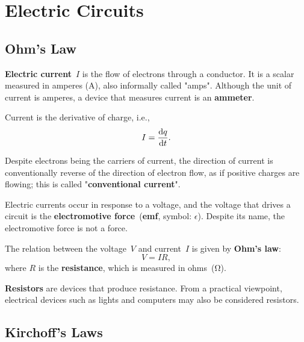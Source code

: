 \chapter{Electric Circuits}

\section{Ohm's Law}

\textbf{Electric current}~\(I\) is the flow of electrons through a conductor.
It is a scalar measured in amperes (\unit{\ampere}),
also informally called "amps".
Although the unit of current is amperes,
a device that measures current is an \textbf{ammeter}.

Current is the derivative of charge, i.e.,
\begin{equation} \label{eq:current-charge}
    I = \odv{q}{t}.
\end{equation}

Despite electrons being the carriers of current,
the direction of current is conventionally reverse
of the direction of electron flow,
as if positive charges are flowing;
this is called "\textbf{conventional current}".

Electric currents occur in response to a voltage,
and the voltage that drives a circuit is the \textbf{electromotive
force}~(\textbf{emf}, symbol: \(\epsilon\)).
Despite its name, the electromotive force is not a force.

The relation between the voltage~\(V\) and current~\(I\) is given by
\textbf{Ohm's law}:
\begin{equation} \label{eq:ohms-law}
    V = I R,
\end{equation}
where \(R\) is the \textbf{resistance}, which is measured in ohms~(\unit{\ohm}).

\textbf{Resistors} are devices that produce resistance.
From a practical viewpoint,
electrical devices such as lights and computers may also be
considered resistors.

\section{Kirchoff's Laws}

